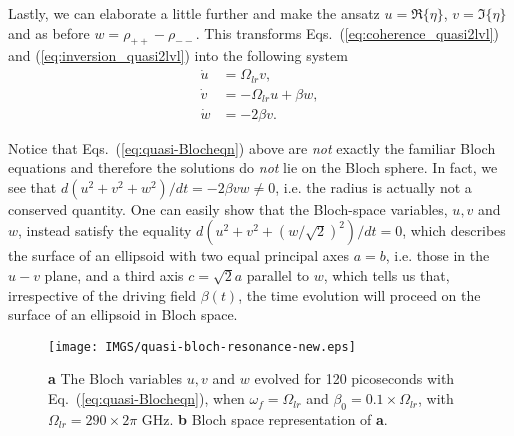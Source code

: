 \documentclass[reprint,secnumarabic,amssymb, nobibnotes, aip, prd]{revtex4-1}
\begin{document}
Lastly, we can elaborate a little further and make the ansatz $u=\Re\{\eta\}$, $v =\Im\{\eta\}$ and as before $w = \rho_{++}-\rho_{--}$. This transforms Eqs.~(\ref{eq:coherence_quasi2lvl}) and (\ref{eq:inversion_quasi2lvl}) into the following system 
\begin{subequations}
	\label{eq:quasi-Blocheqn}
	\begin{align}
		\dot{u} &= \Omega_{lr} v , \\
		\dot{v} &= -\Omega_{lr} u +\beta w , \\
		\dot{w} &= -2\beta v.
	\end{align}
\end{subequations}

 Notice that Eqs.~(\ref{eq:quasi-Blocheqn}) above are \emph{not} exactly the familiar Bloch equations and therefore the solutions do \emph{not} lie on the Bloch sphere. In fact, we see that $d(u^2+v^2+w^2)/dt = -2\beta vw \neq 0$, i.e. the radius is actually not a conserved quantity. One can easily show that the Bloch-space variables, $u,v $ and $w$, instead satisfy the equality $d(u^2+v^2+(w/\sqrt{2})^2)/dt = 0$, which describes the surface of an ellipsoid with two equal principal axes $a=b$, i.e. those in the $u-v$ plane, and a third axis $c = \sqrt{2}a$ parallel to $w$, which tells us that, irrespective of the driving field $\beta(t)$, the time evolution will proceed on the surface of an ellipsoid in Bloch space. 
\begin{figure}[h!]
	\begin{center}
		\texttt{[image: IMGS/quasi-bloch-resonance-new.eps]}
		\caption{\textbf{a} The Bloch variables $u,v$ and $w$ evolved for 120 picoseconds with Eq.~(\ref{eq:quasi-Blocheqn}), when $\omega_f = \Omega_{lr}$ and $\beta_0 = 0.1\times\Omega_{lr}$, with $\Omega_{lr} = 290\times 2\pi$ GHz. \textbf{b} Bloch space representation of \textbf{a}.} \label{fig:quasi-bloch-resonance}
	\end{center}	
\end{figure}
\end{document}
